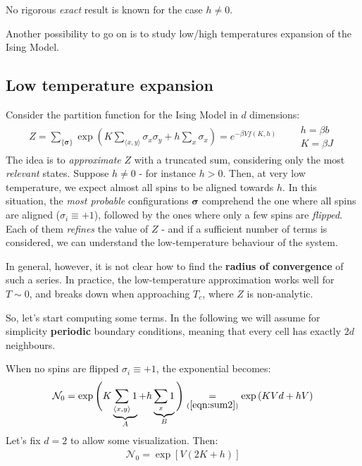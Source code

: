 \documentclass[../../main.tex]{subfiles}
\begin{document}
\medskip

No rigorous \textit{exact} result is known for the case $h \neq 0$. 

\medskip

Another possibility to go on is to study low/high temperatures expansion of the Ising Model. 



\subsection{Low temperature expansion}
Consider the partition function for the Ising Model in $d$ dimensions:
\begin{align}\label{eqn:Z-again}
    Z= \sum_{\{\bm{\sigma}\}} \exp\left(K \sum_{\langle x,y \rangle} \sigma_x \sigma_y + h \sum_x \sigma_x\right) = e^{-\beta V f(K,h)} \qquad \substack{h = \beta b\\K = \beta J}
\end{align}
The idea is to \textit{approximate} $Z$ with a truncated sum, considering only the most \textit{relevant} states. Suppose $h\neq 0$ - for instance $h > 0$. Then, at very low temperature, we expect almost all spins to be aligned towards $h$. In this situation, the \textit{most probable} configurations $\bm{\sigma}$ comprehend the one where all spins are aligned ($\sigma_i \equiv +1$), followed by the ones where only a few spins are \textit{flipped}. Each of them \textit{refines} the value of $Z$ - and if a sufficient number of terms is considered, we can understand the low-temperature behaviour of the system.

\medskip

In general, however, it is not clear how to find the \textbf{radius of convergence} of such a series. In practice, the low-temperature approximation works well for $T \sim 0$, and breaks down when approaching $T_c$, where $Z$ is non-analytic.  

\medskip

So, let's start computing some terms. In the following we will assume for simplicity \textbf{periodic} boundary conditions, meaning that every cell has exactly $2d$ neighbours.


When no spins are flipped $\sigma_i \equiv +1$, the exponential becomes:
\begin{align}\label{eqn:term0a}
    \mathcal{N}_0 =\exp\Bigg(K \underbrace{\sum_{\langle x,y \rangle} 1 }_{A}+ h \underbrace{\sum_x 1}_{B}\Bigg) \underset{(\ref{eqn:sum2})}{=}  \exp\left(K V d + h V\right)
\end{align}  
Let's fix $d=2$ to allow some visualization. Then:
\begin{align}\label{eqn:term0}
    \mathcal{N}_0 = \exp[V(2K + h)]
\end{align}
\end{document}

